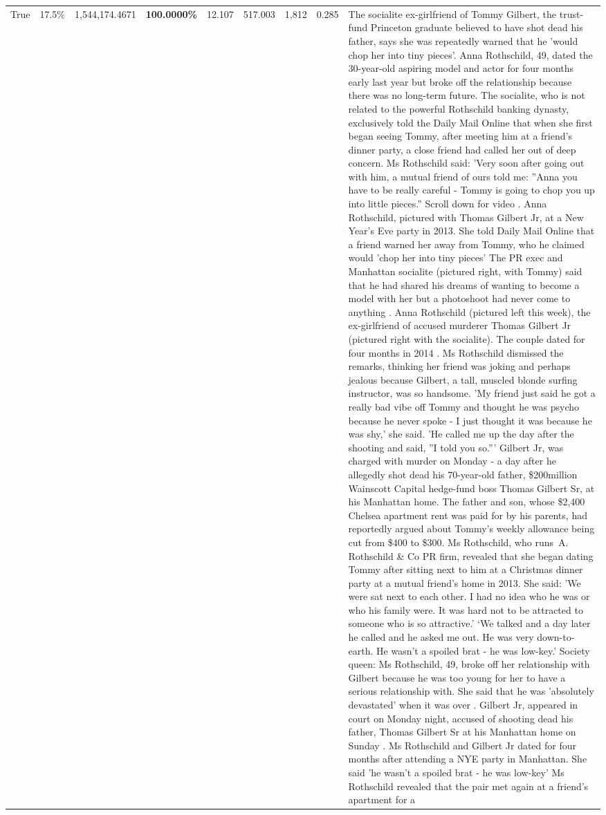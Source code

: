 \begin{table}[H]
\begin{tabular}{lllrlllll}
True & 17.5\% & 1,544,174.4671 & \bfseries \color{red} 100.0000\% & 12.107 & 517.003 & 1,812 & 0.285 & The socialite ex-girlfriend of Tommy Gilbert, the trust-fund Princeton graduate believed to have shot dead his father, says she was repeatedly warned that he 'would chop her into tiny pieces'. Anna Rothschild, 49, dated the 30-year-old aspiring model and actor for four months early last year but broke off the relationship because there was no long-term future. The socialite, who is not related to the powerful Rothschild banking dynasty, exclusively told the Daily Mail Online that when she first began seeing Tommy, after meeting him at a friend's dinner party, a close friend had called her out of deep concern. Ms Rothschild said: 'Very soon after going out with him, a mutual friend of ours told me: ''Anna you have to be really careful - Tommy is going to chop you up into little pieces.'' Scroll down for video . Anna Rothschild, pictured with Thomas Gilbert Jr, at a New Year's Eve party in 2013. She told Daily Mail Online that a friend warned her away from Tommy, who he claimed would 'chop her into tiny pieces' The PR exec and Manhattan socialite (pictured right, with Tommy) said that he had shared his dreams of wanting to become a model with her but a photoshoot had never come to anything . Anna Rothschild (pictured left this week), the ex-girlfriend of accused murderer Thomas Gilbert Jr (pictured right with the socialite). The couple dated for four months in 2014 . Ms Rothschild dismissed the remarks, thinking her friend was joking and perhaps jealous because Gilbert, a tall, muscled blonde surfing instructor, was so handsome. 'My friend just said he got a really bad vibe off Tommy and thought he was psycho because he never spoke - I just thought it was because he was shy,' she said. 'He called me up the day after the shooting and said, ''I told you so.''' Gilbert Jr, was charged with murder on Monday - a day after he allegedly shot dead his 70-year-old father, \$200million Wainscott Capital hedge-fund boss Thomas Gilbert Sr, at his Manhattan home. The father and son, whose \$2,400 Chelsea apartment rent was paid for by his parents, had reportedly argued about Tommy's weekly allowance being cut from \$400 to \$300. Ms Rothschild, who runs A. Rothschild \& Co PR firm, revealed that she began dating Tommy after sitting next to him at a Christmas dinner party at a mutual friend's home in 2013. She said: 'We were sat next to each other. I had no idea who he was or who his family were. It was hard not to be attracted to someone who is so attractive.' ‘We talked and a day later he called and he asked me out. He was very down-to-earth. He wasn’t a spoiled brat - he was low-key.’ Society queen: Ms Rothschild, 49, broke off her relationship with Gilbert because he was too young for her to have a serious relationship with. She said that he was 'absolutely devastated' when it was over . Gilbert Jr, appeared in court on Monday night, accused of shooting dead his father, Thomas Gilbert Sr at his Manhattan home on Sunday . Ms Rothschild and Gilbert Jr dated for four months after attending a NYE party in Manhattan. She said 'he wasn't a spoiled brat - he was low-key' Ms Rothschild revealed that the pair met again at a friend’s apartment for a 
\end{tabular}
\end{table}

